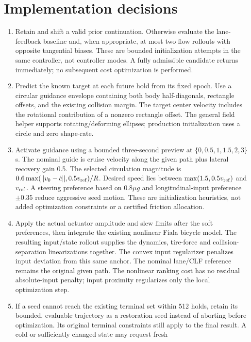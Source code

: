 \documentclass[11pt]{article}
\begin{document}
\section{Implementation decisions}
\begin{enumerate}
\item Retain and shift a valid prior continuation. Otherwise evaluate the
lane-feedback baseline and, when appropriate, at most two flow rollouts with
opposite tangential biases. These are bounded initialization attempts in the
same controller, not controller modes. A fully admissible candidate returns
immediately; no subsequent cost optimization is performed.
\item Predict the known target at each future hold from its fixed epoch.
Use a circular guidance envelope containing both body half-diagonals,
rectangle offsets, and the existing collision margin. The target center
velocity includes the rotational contribution of a nonzero rectangle offset.
The general field helper supports rotating/deforming ellipses; production
initialization uses a circle and zero shape-rate.
\item Activate guidance using a bounded three-second preview at
$\{0,0.5,1,1.5,2,3\}$ s. The nominal guide is cruise velocity along the given
path plus lateral recovery gain 0.5. The selected circulation magnitude is
$0.6\max(\|v_0-\dot c\|,0.5v_{\rm ref})/R$. Desired speed lies between
$\max(1.5,0.5v_{\rm ref})$ and $v_{\rm ref}$. A steering preference based on
$0.8\mu g$ and longitudinal-input preference $\pm0.35$ reduce aggressive
seed motion. These are initialization heuristics, not added optimization
constraints or a certified friction allocation.
\item Apply the actual actuator amplitude and slew limits after the soft
preferences, then integrate the existing nonlinear Fiala bicycle model.
The resulting input/state rollout supplies the dynamics, tire-force and
collision-separation linearizations together. The convex input regularizer
penalizes input deviation from this same anchor. The nominal lane/CLF
reference remains the original given path. The nonlinear ranking cost has
no residual absolute-input penalty; input proximity regularizes only the
local optimization step.
\item If a seed cannot reach the existing terminal set within 512 holds,
retain its bounded, evaluable trajectory as a restoration seed instead of
aborting before optimization. Its original terminal constraints still apply
to the final result. A cold or sufficiently changed state may request fresh

\end{enumerate}
\end{document}
